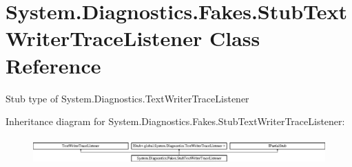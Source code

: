 \hypertarget{class_system_1_1_diagnostics_1_1_fakes_1_1_stub_text_writer_trace_listener}{\section{System.\-Diagnostics.\-Fakes.\-Stub\-Text\-Writer\-Trace\-Listener Class Reference}
\label{class_system_1_1_diagnostics_1_1_fakes_1_1_stub_text_writer_trace_listener}
}


Stub type of System.\-Diagnostics.\-Text\-Writer\-Trace\-Listener 


Inheritance diagram for System.\-Diagnostics.\-Fakes.\-Stub\-Text\-Writer\-Trace\-Listener\-:\begin{figure}[H]
\begin{center}
\leavevmode
\includegraphics[height=1.042830cm]{class_system_1_1_diagnostics_1_1_fakes_1_1_stub_text_writer_trace_listener}
\end{center}
\end{figure}
